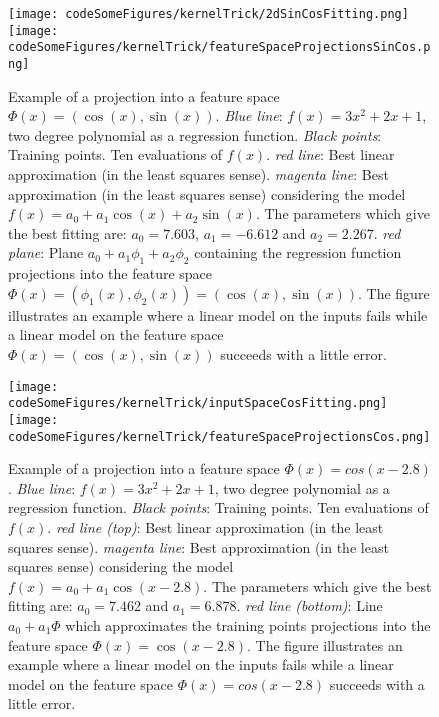 \begin{figure}[!htbp]
  \centering
    \texttt{[image: codeSomeFigures/kernelTrick/2dSinCosFitting.png]}
    \texttt{[image: codeSomeFigures/kernelTrick/featureSpaceProjectionsSinCos.png]}
  \caption[Example of a projection into a feature space $\Phi(x) = (\cos(x),\sin(x))$]%
{Example of a projection into a feature space $\Phi(x) = (\cos(x),\sin(x))$. 
  \emph{Blue line}: $f(x) = 3x^2+2x+1$, two degree polynomial as a regression function. 
  \emph{Black points}: Training points. Ten evaluations of $f(x)$. 
  \emph{red line}: Best linear approximation (in the least squares sense). 
  \emph{magenta line}: Best approximation (in the least squares sense) considering the model $f(x) = a_0 + a_1\cos(x) + a_2\sin(x)$. The parameters which give the best fitting are: $a_0 = 7.603$, $a_1 = -6.612$ and $a_2 = 2.267$.
  \emph{red plane}: Plane $a_0+a_1\phi_1+a_2\phi_2$ containing the regression function projections into the feature space $\Phi(x) = (\phi_1(x),\phi_2(x)) = (\cos(x),\sin(x))$.
  The figure illustrates an example where a linear model on the inputs fails while a linear model on the feature space $\Phi(x) = (\cos(x),\sin(x))$ succeeds with a little error.} 
  \label{fig_featureSpaceProjectionsExampleSinCos}
\end{figure}

\begin{figure}[!htbp]
  \centering
    \texttt{[image: codeSomeFigures/kernelTrick/inputSpaceCosFitting.png]}
    \texttt{[image: codeSomeFigures/kernelTrick/featureSpaceProjectionsCos.png]}
  \caption[Example of a projection into a feature space $\Phi(x) = cos(x-2.8)$]%
{Example of a projection into a feature space $\Phi(x) = cos(x-2.8)$. 
  \emph{Blue line}: $f(x) = 3x^2+2x+1$, two degree polynomial as a regression function. 
  \emph{Black points}: Training points. Ten evaluations of $f(x)$. 
  \emph{red line (top)}: Best linear approximation (in the least squares sense). 
  \emph{magenta line}: Best approximation (in the least squares sense) considering the model $f(x) = a_0 + a_1\cos(x-2.8)$. The parameters which give the best fitting are: $a_0 = 7.462$ and $a_1 = 6.878$.
  \emph{red line (bottom)}: Line $a_0+a_1\Phi$ which approximates the training points projections into the feature space $\Phi(x) = \cos(x-2.8)$.
  The figure illustrates an example where a linear model on the inputs fails while a linear model on the feature space $\Phi(x) = cos(x-2.8)$ succeeds with a little error.} 
  \label{fig_featureSpaceProjectionsExampleCos}
\end{figure}

